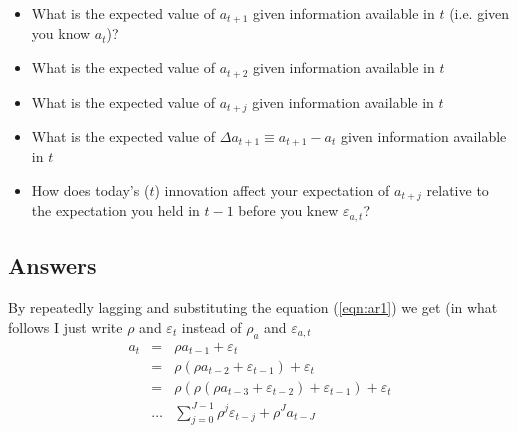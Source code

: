 \documentclass[authoryear,11pt]{elsarticle}
\begin{document}
\begin{itemize}
\item	What is the expected value of $a_{t+1}$ given information available in $t$ (i.e. given you know $a_{t}$)?
\item	What is the expected value of $a_{t+2}$ given information available in $t$
\item	What is the expected value of $a_{t+j}$ given information available in $t$
\item	What is the expected value of $\Delta a_{t+1} \equiv a_{t+1} - a_{t}$ given information available in $t$
\item	How does today's ($t$) innovation affect your expectation of $a_{t+j}$ relative to the expectation you held in $t-1$ before you knew $\varepsilon_{a,t}$?
\end{itemize}


\subsection*{Answers}
By repeatedly lagging and substituting the equation (\ref{eqn:ar1}) we get (in what follows I just write $\rho$ and $\varepsilon_{t}$ instead of  $\rho_{a}$ and $\varepsilon_{a,t}$
\begin{eqnarray*}
a_{t} 	&=&	\rho a_{t-1} + \varepsilon_{t} \\
		&=&	\rho(\rho a_{t-2} + \varepsilon_{t-1}) + \varepsilon_{t} \\
		&=&	\rho(\rho(\rho a_{t-3} + \varepsilon_{t-2}) + \varepsilon_{t-1}) + \varepsilon_{t}	\\
		&\ldots& \sum\limits_{j=0}^{J-1} \rho^{j} \varepsilon_{t-j} + \rho^{J}a_{t-J}
\end{eqnarray*}
\end{document}
